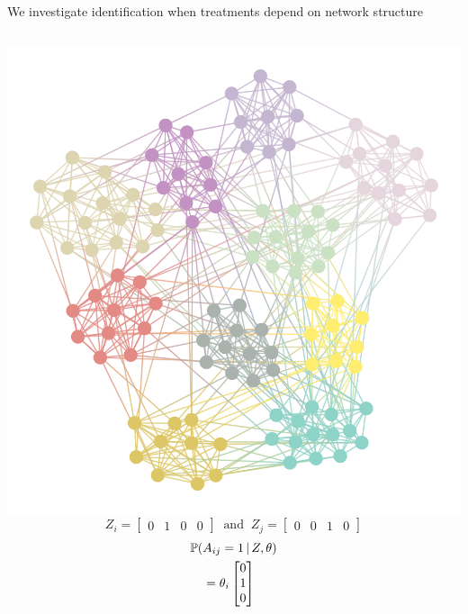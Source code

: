 \documentclass[aspectratio=169]{beamer}
\theoremstyle{remark}
\begin{document}
\begin{frame}{We investigate identification when treatments depend on network structure}
    \begin{columns}
        \centering
        \includegraphics[width=\textwidth]{./assortative.png}
        \vspace{1mm}
        \begin{equation*}
            Z_i = \begin{bmatrix}
                0 & 1 & 0 & 0
            \end{bmatrix}
            ~\text{ and }~
            Z_j = \begin{bmatrix}
                0 & 0 & 1 & 0
            \end{bmatrix}
        \end{equation*}
        \begin{align*}
             & \P[Z, \theta]{A_{ij} = 1}                                      \\
             & \quad =
            \theta_i 
            \begin{bmatrix}
                0 \\
                1 \\
                0 \\

\end{bmatrix}
\end{align*}
\end{columns}
\end{frame}
\end{document}
